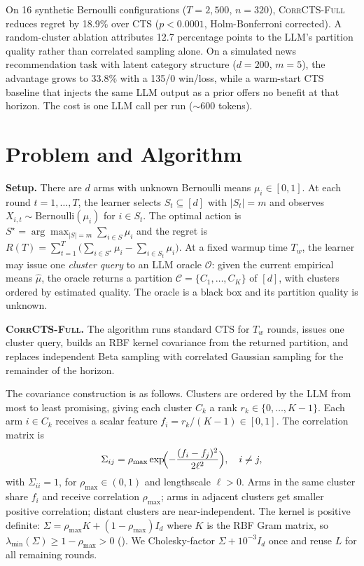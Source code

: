 \documentclass{article}
\theoremstyle{plain}
\theoremstyle{definition}
\theoremstyle{remark}
\newcommand{\opt}{S^{\star}}
\newcommand{\CorrFull}{\textsc{CorrCTS-Full}}
\begin{document}
On 16 synthetic Bernoulli configurations ($T{=}2{,}500$, $n{=}320$), \CorrFull{} reduces regret by 18.9\% over CTS ($p < 0.0001$, Holm-Bonferroni corrected).
A random-cluster ablation attributes 12.7 percentage points to the LLM's partition quality rather than correlated sampling alone.
On a simulated news recommendation task with latent category structure ($d{=}200$, $m{=}5$), the advantage grows to 33.8\% with a 135/0 win/loss, while a warm-start CTS baseline that injects the same LLM output as a prior offers no benefit at that horizon.
The cost is one LLM call per run (${\sim}600$ tokens).

\section{Problem and Algorithm}\label{sec:algo}

\textbf{Setup.}
There are $d$ arms with unknown Bernoulli means $\mu_i \in [0,1]$.
At each round $t = 1, \ldots, T$, the learner selects $S_t \subseteq [d]$ with $|S_t| = m$ and observes $X_{i,t} \sim \mathrm{Bernoulli}(\mu_i)$ for $i \in S_t$.
The optimal action is $\opt = \arg\max_{|S|=m} \sum_{i \in S} \mu_i$ and the regret is $R(T) = \sum_{t=1}^T \bigl(\sum_{i \in \opt} \mu_i - \sum_{i \in S_t} \mu_i\bigr)$.
At a fixed warmup time $T_w$, the learner may issue one \emph{cluster query} to an LLM oracle $\mathcal{O}$: given the current empirical means $\hat\mu$, the oracle returns a partition $\mathcal{C} = \{C_1, \ldots, C_K\}$ of $[d]$, with clusters ordered by estimated quality.
The oracle is a black box and its partition quality is unknown.

\textbf{\CorrFull.}
The algorithm runs standard CTS for $T_w$ rounds, issues one cluster query, builds an RBF kernel covariance from the returned partition, and replaces independent Beta sampling with correlated Gaussian sampling for the remainder of the horizon.

The covariance construction is as follows.
Clusters are ordered by the LLM from most to least promising, giving each cluster $C_k$ a rank $r_k \in \{0, \ldots, K-1\}$.
Each arm $i \in C_k$ receives a scalar feature $f_i = r_k / (K-1) \in [0,1]$.
The correlation matrix is
\begin{equation}\label{eq:rbf}
  \Sigma_{ij} = \rho_{\max} \exp\!\Bigl(-\frac{(f_i - f_j)^2}{2\ell^2}\Bigr), \quad i \neq j,
\end{equation}
with $\Sigma_{ii} = 1$, for $\rho_{\max} \in (0,1)$ and lengthscale $\ell > 0$.
Arms in the same cluster share $f_i$ and receive correlation $\rho_{\max}$; arms in adjacent clusters get smaller positive correlation; distant clusters are near-independent.
The kernel is positive definite: $\Sigma = \rho_{\max} K + (1 - \rho_{\max}) I_d$ where $K$ is the RBF Gram matrix, so $\lambda_{\min}(\Sigma) \geq 1 - \rho_{\max} > 0$ ().
We Cholesky-factor $\Sigma + 10^{-3} I_d$ once and reuse $L$ for all remaining rounds.
\end{document}
